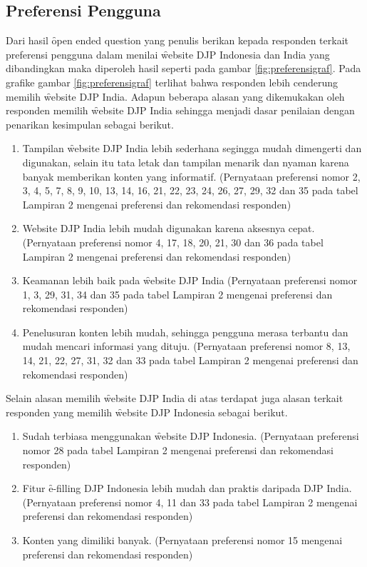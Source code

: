 \subsection{Preferensi Pengguna}
Dari hasil \f{open ended question} yang penulis berikan kepada responden terkait preferensi pengguna dalam menilai \f{website} DJP Indonesia dan India yang dibandingkan maka diperoleh hasil seperti pada gambar \ref{fig:preferensigraf}. Pada grafike gambar \ref{fig:preferensigraf} terlihat bahwa responden lebih cenderung memilih \f{website} DJP India.
Adapun beberapa alasan yang dikemukakan oleh responden memilih \f{website} DJP India sehingga menjadi dasar penilaian dengan penarikan kesimpulan sebagai berikut.
\begin{enumerate}
	\item Tampilan \f{website} DJP India lebih sederhana segingga mudah dimengerti dan digunakan, selain itu tata letak dan tampilan menarik dan nyaman karena banyak memberikan konten yang informatif. (Pernyataan preferensi nomor 2, 3, 4, 5, 7, 8, 9, 10, 13, 14, 16, 21, 22, 23, 24, 26, 27, 29, 32 dan 35 pada tabel Lampiran 2 mengenai preferensi dan rekomendasi responden)
	\item {Website} DJP India lebih mudah digunakan karena aksesnya cepat. (Pernyataan preferensi nomor 4, 17, 18, 20, 21, 30 dan 36 pada tabel Lampiran 2 mengenai preferensi dan rekomendasi responden)
	\item Keamanan lebih baik pada \f{website} DJP India (Pernyataan preferensi nomor 1, 3, 29, 31, 34 dan 35 pada tabel Lampiran 2 mengenai preferensi dan rekomendasi responden)
	\item Penelusuran konten lebih mudah, sehingga pengguna merasa terbantu dan mudah mencari informasi yang dituju. (Pernyataan preferensi nomor 8, 13, 14, 21, 22, 27, 31, 32 dan 33 pada tabel Lampiran 2 mengenai preferensi dan rekomendasi responden)
\end{enumerate}
Selain alasan memilih \f{website} DJP India di atas terdapat juga alasan terkait responden yang memilih \f{website} DJP Indonesia sebagai berikut.
\begin{enumerate}
	\item Sudah terbiasa menggunakan \f{website} DJP Indonesia. (Pernyataan preferensi nomor 28 pada tabel Lampiran 2 mengenai preferensi dan rekomendasi responden)
	\item Fitur \f{e-filling} DJP Indonesia lebih mudah dan praktis daripada DJP India. (Pernyataan preferensi nomor 4, 11 dan 33 pada tabel Lampiran 2 mengenai preferensi dan rekomendasi responden)
	\item Konten yang dimiliki banyak. (Pernyataan preferensi nomor 15 mengenai preferensi dan rekomendasi responden)
\end{enumerate}

